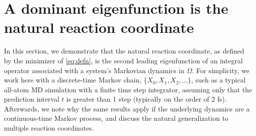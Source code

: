 \documentclass[aip, jcp, preprint, linenumbers, nofootinbib]{revtex4-1}
\begin{document}


\section{A dominant eigenfunction is the natural reaction coordinate}
\label{sect:natureal_reaction}
In this section, we demonstrate that the natural reaction coordinate, as defined by the minimizer of \cref{eq:defn}, is the second leading eigenfunction of an integral operator associated with a system's Markovian dynamics in $\Omega$. For simplicity, we work here with a discrete-time Markov chain, $\{X_0, X_1, X_2, \ldots \}$, such as a typical all-atom MD simulation with a finite time step integrator, assuming only that the prediction interval $t$ is greater than 1 step (typically on the order of 2 fs). Afterwards, we note why the same results apply if the underlying dynamics are a continuous-time Markov process, and discuss the natural generalization to multiple reaction coordinates.
\end{document}
